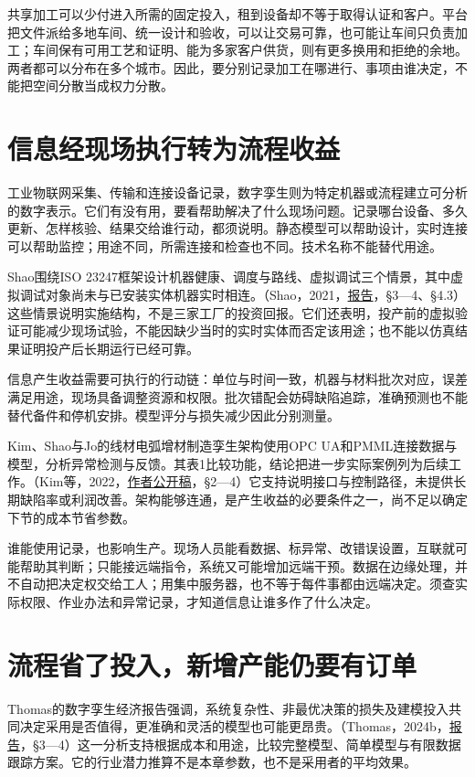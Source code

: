 \documentclass[UTF8,fontset=windows,12pt,a4paper,oneside,openany]{ctexbook}
\begin{document}
共享加工可以少付进入所需的固定投入，租到设备却不等于取得认证和客户。平台把文件派给多地车间、统一设计和验收，可以让交易可靠，也可能让车间只负责加工；车间保有可用工艺和证明、能为多家客户供货，则有更多换用和拒绝的余地。两者都可以分布在多个城市。因此，要分别记录加工在哪进行、事项由谁决定，不能把空间分散当成权力分散。

\section{信息经现场执行转为流程收益}

工业物联网采集、传输和连接设备记录，数字孪生则为特定机器或流程建立可分析的数字表示。它们有没有用，要看帮助解决了什么现场问题。记录哪台设备、多久更新、怎样核验、结果交给谁行动，都须说明。静态模型可以帮助设计，实时连接可以帮助监控；用途不同，所需连接和检查也不同。技术名称不能替代用途。

Shao围绕ISO 23247框架设计机器健康、调度与路线、虚拟调试三个情景，其中虚拟调试对象尚未与已安装实体机器实时相连。（Shao，2021，\href{https://nvlpubs.nist.gov/nistpubs/ams/NIST.AMS.400-2.pdf}{报告}，§3—4、§4.3）这些情景说明实施结构，不是三家工厂的投资回报。它们还表明，投产前的虚拟验证可能减少现场试验，不能因缺少当时的实时实体而否定该用途；也不能以仿真结果证明投产后长期运行已经可靠。

信息产生收益需要可执行的行动链：单位与时间一致，机器与材料批次对应，误差满足用途，现场具备调整资源和权限。批次错配会妨碍缺陷追踪，准确预测也不能替代备件和停机安排。模型评分与损失减少因此分别测量。

Kim、Shao与Jo的线材电弧增材制造孪生架构使用OPC UA和PMML连接数据与模型，分析异常检测与反馈。其表1比较功能，结论把进一步实际案例列为后续工作。（Kim等，2022，\href{https://tsapps.nist.gov/publication/get_pdf.cfm?pub_id=934111}{作者公开稿}，§2—4）它支持说明接口与控制路径，未提供长期缺陷率或利润改善。架构能够连通，是产生收益的必要条件之一，尚不足以确定下节的成本节省参数。

谁能使用记录，也影响生产。现场人员能看数据、标异常、改错误设置，互联就可能帮助其判断；只能接远端指令，系统又可能增加远端干预。数据在边缘处理，并不自动把决定权交给工人；用集中服务器，也不等于每件事都由远端决定。须查实际权限、作业办法和异常记录，才知道信息让谁多作了什么决定。

\section{流程省了投入，新增产能仍要有订单}

Thomas的数字孪生经济报告强调，系统复杂性、非最优决策的损失及建模投入共同决定采用是否值得，更准确和灵活的模型也可能更昂贵。（Thomas，2024b，\href{https://nvlpubs.nist.gov/nistpubs/ams/NIST.AMS.100-61.pdf}{报告}，§3—4）这一分析支持根据成本和用途，比较完整模型、简单模型与有限数据跟踪方案。它的行业潜力推算不是本章参数，也不是采用者的平均效果。
\end{document}
